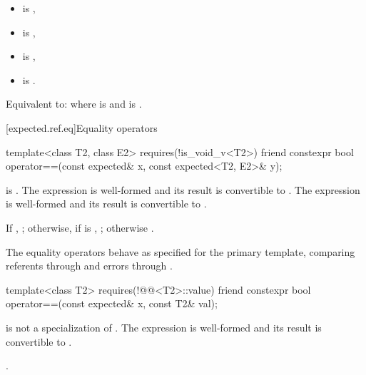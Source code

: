 \begin{itemdescr}
\pnum
\mandates
\begin{itemize}
\item {} is ,
\item {} is ,
\item {} is ,
\item {} is .
\end{itemize}

\pnum
\effects
Equivalent to:  where  is  and  is .
\end{itemdescr}

[expected.ref.eq]{Equality operators}

%
\begin{itemdecl}
template<class T2, class E2>
  requires(!is_void_v<T2>)
friend constexpr bool operator==(const expected& x, const expected<T2, E2>& y);
\end{itemdecl}

\begin{itemdescr}
\pnum
\mandates
{} is . The expression  is well-formed and its result is convertible to . The expression  is well-formed and its result is convertible to .

\pnum
\returns
If , ; otherwise, if  is , ; otherwise .

\pnum
\remarks
The equality operators behave as specified for the primary template, comparing referents through  and errors through .
\end{itemdescr}

%
\begin{itemdecl}
template<class T2>
  requires(!@@<T2>::value)
friend constexpr bool operator==(const expected& x, const T2& val);
\end{itemdecl}

\begin{itemdescr}
\pnum
\mandates
{} is not a specialization of . The expression  is well-formed and its result is convertible to .

\pnum
\returns
{}.
\end{itemdescr}

